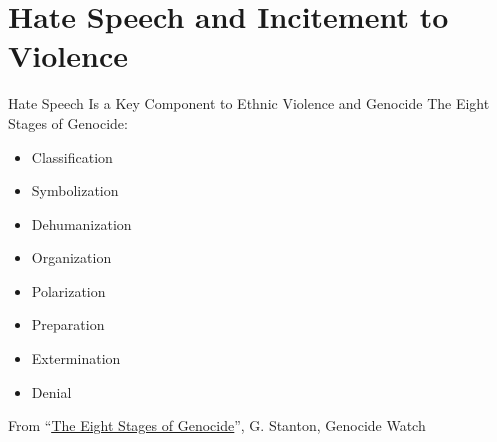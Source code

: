 \documentclass[nobackground,dvipsnames,table]{beamer}
\begin{document}
\section{Hate Speech and Incitement to Violence}

\begin{frame}{Hate Speech Is a Key Component to Ethnic Violence and Genocide}
    The Eight Stages of Genocide:
    \begin{itemize}
        \item Classification
        \item Symbolization
        \item Dehumanization
        \item Organization
        \item Polarization
        \item Preparation
        \item Extermination
        \item Denial
    \end{itemize}
    \small
    From “\underline{\href{https://www.keene.edu/academics/ah/cchgs/resources/educational-handouts/the-eight-stages-of-genocide/download/}{The Eight Stages of Genocide}}”, G. Stanton, Genocide Watch
\end{frame}
\end{document}
